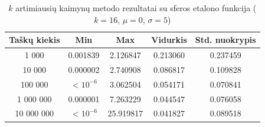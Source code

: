 \begin{table}[H]
    \centering
    \begin{tabular}{|c|c|c|c|c|}
        \hline
        \textbf{Taškų kiekis} & \textbf{Min} & \textbf{Max} & \textbf{Vidurkis} & \textbf{Std. nuokrypis} \\ \hline
        1 000        & 0.001839 & 2.126847 & 0.213060 & 0.237459 \\ \hline
        10 000       & 0.000002 & 2.740908 & 0.086817 & 0.109828 \\ \hline
        100 000      & $<10^{-6}$ & 3.062504 & 0.054171 & 0.070841 \\ \hline
        1 000 000    & 0.000001 & 7.263229 & 0.044547 & 0.076058 \\ \hline
        10 000 000   & $<10^{-6}$ & 25.919817 & 0.041827 & 0.089518 \\ \hline
    \end{tabular}
    \caption{$k$ artimiausių kaimynų metodo rezultatai su sferos etalono funkcija ($k = 16$, $\mu = 0$, $\sigma = 5$)}
\end{table}